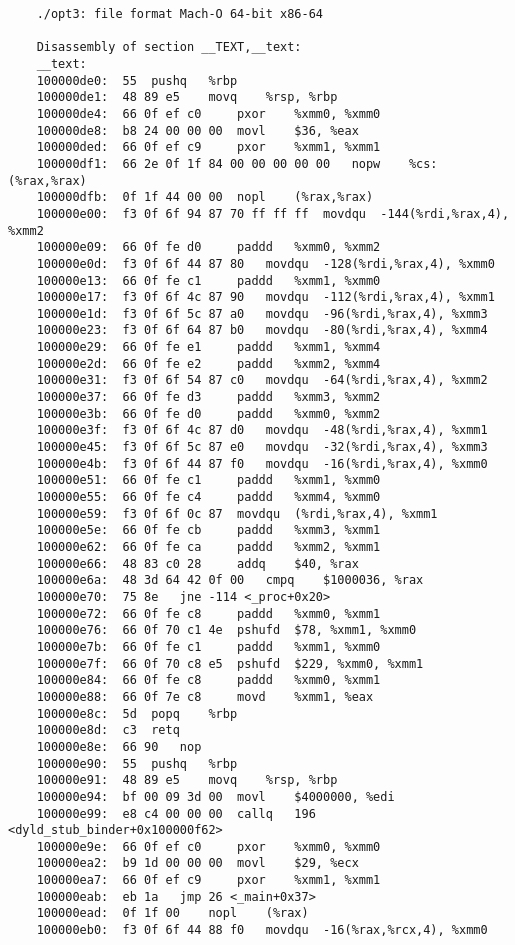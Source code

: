 \documentclass[a4paper]{article}
\begin{document}
\begin{lstlisting}
    ./opt3:	file format Mach-O 64-bit x86-64

    Disassembly of section __TEXT,__text:
    __text:
    100000de0:	55 	pushq	%rbp
    100000de1:	48 89 e5 	movq	%rsp, %rbp
    100000de4:	66 0f ef c0 	pxor	%xmm0, %xmm0
    100000de8:	b8 24 00 00 00 	movl	$36, %eax
    100000ded:	66 0f ef c9 	pxor	%xmm1, %xmm1
    100000df1:	66 2e 0f 1f 84 00 00 00 00 00 	nopw	%cs:(%rax,%rax)
    100000dfb:	0f 1f 44 00 00 	nopl	(%rax,%rax)
    100000e00:	f3 0f 6f 94 87 70 ff ff ff 	movdqu	-144(%rdi,%rax,4), %xmm2
    100000e09:	66 0f fe d0 	paddd	%xmm0, %xmm2
    100000e0d:	f3 0f 6f 44 87 80 	movdqu	-128(%rdi,%rax,4), %xmm0
    100000e13:	66 0f fe c1 	paddd	%xmm1, %xmm0
    100000e17:	f3 0f 6f 4c 87 90 	movdqu	-112(%rdi,%rax,4), %xmm1
    100000e1d:	f3 0f 6f 5c 87 a0 	movdqu	-96(%rdi,%rax,4), %xmm3
    100000e23:	f3 0f 6f 64 87 b0 	movdqu	-80(%rdi,%rax,4), %xmm4
    100000e29:	66 0f fe e1 	paddd	%xmm1, %xmm4
    100000e2d:	66 0f fe e2 	paddd	%xmm2, %xmm4
    100000e31:	f3 0f 6f 54 87 c0 	movdqu	-64(%rdi,%rax,4), %xmm2
    100000e37:	66 0f fe d3 	paddd	%xmm3, %xmm2
    100000e3b:	66 0f fe d0 	paddd	%xmm0, %xmm2
    100000e3f:	f3 0f 6f 4c 87 d0 	movdqu	-48(%rdi,%rax,4), %xmm1
    100000e45:	f3 0f 6f 5c 87 e0 	movdqu	-32(%rdi,%rax,4), %xmm3
    100000e4b:	f3 0f 6f 44 87 f0 	movdqu	-16(%rdi,%rax,4), %xmm0
    100000e51:	66 0f fe c1 	paddd	%xmm1, %xmm0
    100000e55:	66 0f fe c4 	paddd	%xmm4, %xmm0
    100000e59:	f3 0f 6f 0c 87 	movdqu	(%rdi,%rax,4), %xmm1
    100000e5e:	66 0f fe cb 	paddd	%xmm3, %xmm1
    100000e62:	66 0f fe ca 	paddd	%xmm2, %xmm1
    100000e66:	48 83 c0 28 	addq	$40, %rax
    100000e6a:	48 3d 64 42 0f 00 	cmpq	$1000036, %rax
    100000e70:	75 8e 	jne	-114 <_proc+0x20>
    100000e72:	66 0f fe c8 	paddd	%xmm0, %xmm1
    100000e76:	66 0f 70 c1 4e 	pshufd	$78, %xmm1, %xmm0
    100000e7b:	66 0f fe c1 	paddd	%xmm1, %xmm0
    100000e7f:	66 0f 70 c8 e5 	pshufd	$229, %xmm0, %xmm1
    100000e84:	66 0f fe c8 	paddd	%xmm0, %xmm1
    100000e88:	66 0f 7e c8 	movd	%xmm1, %eax
    100000e8c:	5d 	popq	%rbp
    100000e8d:	c3 	retq
    100000e8e:	66 90 	nop
    100000e90:	55 	pushq	%rbp
    100000e91:	48 89 e5 	movq	%rsp, %rbp
    100000e94:	bf 00 09 3d 00 	movl	$4000000, %edi
    100000e99:	e8 c4 00 00 00 	callq	196 <dyld_stub_binder+0x100000f62>
    100000e9e:	66 0f ef c0 	pxor	%xmm0, %xmm0
    100000ea2:	b9 1d 00 00 00 	movl	$29, %ecx
    100000ea7:	66 0f ef c9 	pxor	%xmm1, %xmm1
    100000eab:	eb 1a 	jmp	26 <_main+0x37>
    100000ead:	0f 1f 00 	nopl	(%rax)
    100000eb0:	f3 0f 6f 44 88 f0 	movdqu	-16(%rax,%rcx,4), %xmm0

\end{lstlisting}
\end{document}
